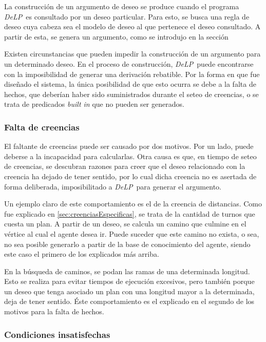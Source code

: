 \documentclass[oneside]{book}
\theoremstyle{definition}
\theoremstyle{example}
\newcommand{\DLP}{\mbox{\textit{DeLP}}}
\begin{document}
La construcción de un argumento de deseo se produce cuando el programa \DLP\ es 
consultado por un deseo particular. Para esto, se busca una regla de deseo cuya cabeza sea
el modelo de deseo al que pertenece el deseo consultado. A partir de esta, se genera un 
argumento, como se introdujo en la sección %

Existen circunstancias que pueden impedir la construcción de un argumento para un determinado
deseo. En el proceso de construcción, \DLP\ puede encontrarse con la imposibilidad de generar
una derivación rebatible. Por la forma en que fue diseñado el sistema, la única posibilidad de
que esto ocurra se debe a la falta de hechos, que deberían haber sido suministrados durante el
seteo de creencias, o se trata de predicados \textit{built in} que no pueden ser generados. 

\subsubsection{Falta de creencias}

El faltante de creencias puede ser causado por dos motivos. Por un lado, puede 
deberse a la incapacidad para calcularlas. Otra causa es que, en tiempo de seteo de creencias,
se descubran razones para creer que el deseo relacionado con la creencia ha dejado de tener 
sentido, por lo cual dicha creencia no es asertada de forma deliberada, imposibilitado a \DLP\ 
para generar el argumento.

Un ejemplo claro de este comportamiento es el de la creencia de distancias. Como fue explicado en 
\ref{sec:creenciasEspecificas}, se trata de la cantidad de turnos que cuesta un plan. A partir de un
deseo, se calcula un camino que culmine en el vértice al cual el agente desea ir. Puede suceder que 
este camino no exista, o sea, no sea posible generarlo a partir de la base de conocimiento del 
agente, siendo este caso el primero de los explicados más arriba. 

En la búsqueda de caminos, se podan las ramas de una determinada longitud. Esto se realiza para evitar
tiempos de ejecución excesivos, pero también porque un deseo que tenga asociado un plan con una 
longitud mayor a la determinada, deja de tener sentido. Éste comportamiento es el explicado en el 
segundo de los motivos para la falta de hechos.

\subsubsection{Condiciones insatisfechas}
\end{document}
